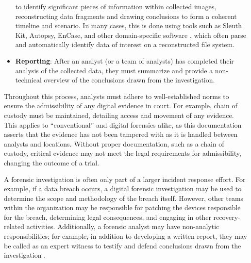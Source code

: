 \documentclass[letterpaper,12pt]{report}
\begin{document}
\begin{itemize}
  to identify significant pieces of information within collected images,
  reconstructing data fragments and drawing conclusions to form a
  coherent timeline and scenario. In many cases, this is done using
  tools such as Sleuth Kit, Autopsy, EnCase, and other domain-specific
  software \cite{jonesInsightDigitalForensics2022}, which often
  parse and automatically identify data of interest on a reconstructed
  file system.
\item
  \textbf{Reporting}: After an analyst (or a team of analysts) has
  completed their analysis of the collected data, they must summarize
  and provide a non-technical overview of the conclusions drawn from the
  investigation.
\end{itemize}

Throughout this process, analysts must adhere to well-established norms
to ensure the admissibility of any digital evidence in court. For
example, chain of custody must be maintained, detailing access and
movement of any evidence. This applies to ``conventional'' and digital
forensics alike, as this documentation asserts that the evidence has not
been tampered with as it is handled between analysts and locations.
Without proper documentation, such as a chain of custody, critical
evidence may not meet the legal requirements for admissibility, changing
the outcome of a trial.

A forensic investigation is often only part of a larger incident
response effort. For example, if a data breach occurs, a digital
forensic investigation may be used to determine the scope and
methodology of the breach itself. However, other teams within the
organization may be responsible for patching the devices responsible for
the breach, determining legal consequences, and engaging in other
recovery-related activities. Additionally, a forensic analyst may have
non-analytic responsibilities; for example, in addition to developing a
written report, they may be called as an expert witness to testify and
defend conclusions drawn from the investigation
\cite{andersonComparativeStudyTeaching2006,conklinComputerForensics2022,cooperStandardsDigitalForensics2010}.
\end{document}
